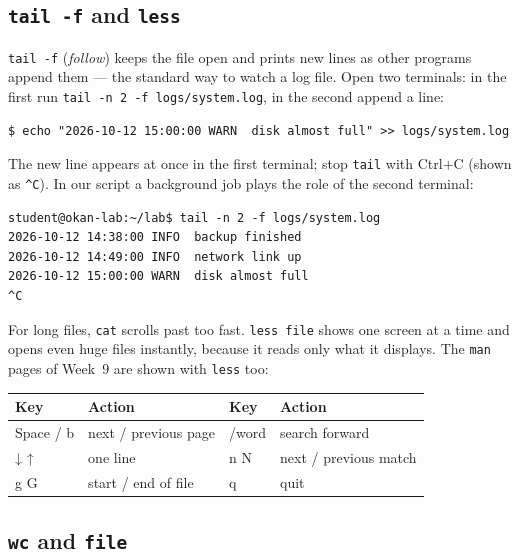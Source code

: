 \documentclass[11pt,a4paper]{article}
\newcommand{\cmd}[1]{\texttt{#1}}
\begin{document}
\subsection{\texttt{tail -f} and \texttt{less}}

\cmd{tail -f} (\emph{follow}) keeps the file open and prints new lines as other programs append them --- the standard way to watch a log file. Open two terminals: in the first run \cmd{tail -n 2 -f logs/system.log}, in the second append a line:
\begin{lstlisting}[style=term]
$ echo "2026-10-12 15:00:00 WARN  disk almost full" >> logs/system.log
\end{lstlisting}
The new line appears at once in the first terminal; stop \cmd{tail} with Ctrl+C (shown as \texttt{\^{}C}). In our script a background job plays the role of the second terminal:

\begin{lstlisting}[style=term]
student@okan-lab:~/lab$ tail -n 2 -f logs/system.log
2026-10-12 14:38:00 INFO  backup finished
2026-10-12 14:49:00 INFO  network link up
2026-10-12 15:00:00 WARN  disk almost full
^C
\end{lstlisting}

For long files, \cmd{cat} scrolls past too fast. \cmd{less file} shows one screen at a time and opens even huge files instantly, because it reads only what it displays. The \cmd{man} pages of Week~9 are shown with \cmd{less} too:

\begin{center}
\renewcommand{\arraystretch}{1.15}
\begin{tabular}{@{}>{\ttfamily}l l >{\ttfamily}l l@{}}
\toprule
\textrm{\textbf{Key}} & \textbf{Action} & \textrm{\textbf{Key}} & \textbf{Action} \\
\midrule
Space / b & next / previous page & /word & search forward \\
↓ ↑ & one line & n  N & next / previous match \\
g  G & start / end of file & q & quit \\
\bottomrule
\end{tabular}
\end{center}

\subsection{\texttt{wc} and \texttt{file}}
\end{document}
